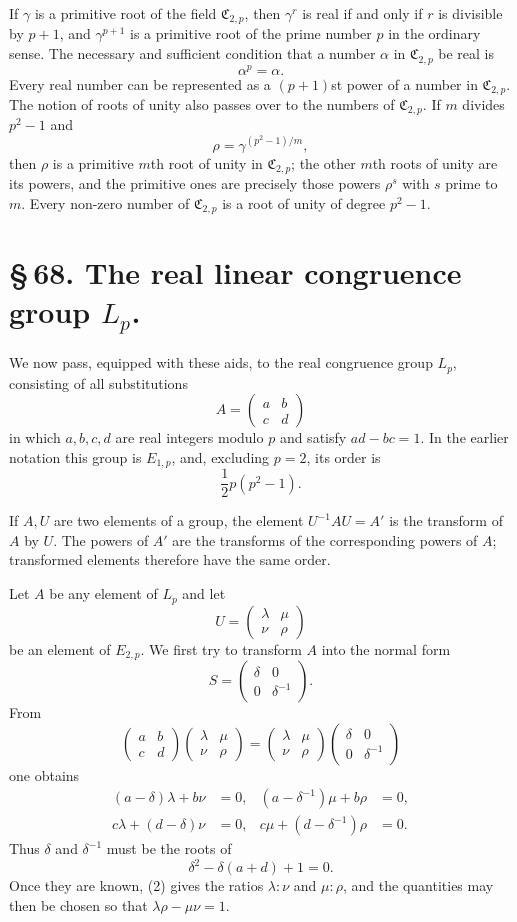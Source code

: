 \documentclass[11pt]{article}
\providecommand{\mat}[4]{\begin{pmatrix}#1&#2\\#3&#4\end{pmatrix}}
\providecommand{\mat}[4]{\begin{pmatrix}#1&#2\\#3&#4\end{pmatrix}}
\providecommand{\Cfield}{\mathfrak C}
\begin{document}
If $\gamma$ is a primitive root of the field $\Cfield_{2,p}$, then $\gamma^r$ is real if and only if $r$ is divisible by $p+1$, and $\gamma^{p+1}$ is a primitive root of the prime number $p$ in the ordinary sense. The necessary and sufficient condition that a number $\alpha$ in $\Cfield_{2,p}$ be real is
\[
 \alpha^p=\alpha .
\]
Every real number can be represented as a $(p+1)$st power of a number in $\Cfield_{2,p}$. The notion of roots of unity also passes over to the numbers of $\Cfield_{2,p}$. If $m$ divides $p^2-1$ and
\[
 \rho=\gamma^{(p^2-1)/m},
\]
then $\rho$ is a primitive $m$th root of unity in $\Cfield_{2,p}$; the other $m$th roots of unity are its powers, and the primitive ones are precisely those powers $\rho^s$ with $s$ prime to $m$. Every non-zero number of $\Cfield_{2,p}$ is a root of unity of degree $p^2-1$.

\section*{\S\,68. The real linear congruence group $L_p$.}

We now pass, equipped with these aids, to the real congruence group $L_p$, consisting of all substitutions
\[
 A=\mat{a}{b}{c}{d}
\]
in which $a,b,c,d$ are real integers modulo $p$ and satisfy $ad-bc=1$. In the earlier notation this group is $E_{1,p}$, and, excluding $p=2$, its order is
\[
 \frac12 p(p^2-1).
\]

If $A,U$ are two elements of a group, the element $U^{-1}AU=A'$ is the transform of $A$ by $U$. The powers of $A'$ are the transforms of the corresponding powers of $A$; transformed elements therefore have the same order.

Let $A$ be any element of $L_p$ and let
\[
 U=\mat{\lambda}{\mu}{\nu}{\rho}
\]
be an element of $E_{2,p}$. We first try to transform $A$ into the normal form
\begin{equation}
 S=\mat{\delta}{0}{0}{\delta^{-1}} .
 \tag{1}
\end{equation}
From
\[
 \mat{a}{b}{c}{d}\mat{\lambda}{\mu}{\nu}{\rho}
 =\mat{\lambda}{\mu}{\nu}{\rho}\mat{\delta}{0}{0}{\delta^{-1}}
\]
one obtains
\begin{equation}
\begin{aligned}
 (a-\delta)\lambda+b\nu&=0,&
 (a-\delta^{-1})\mu+b\rho&=0,\\
 c\lambda+(d-\delta)\nu&=0,&
 c\mu+(d-\delta^{-1})\rho&=0.
\end{aligned}
\tag{2}
\end{equation}
Thus $\delta$ and $\delta^{-1}$ must be the roots of
\begin{equation}
 \delta^2-\delta(a+d)+1=0.
 \tag{3}
\end{equation}
Once they are known, (2) gives the ratios $\lambda:\nu$ and $\mu:\rho$, and the quantities may then be chosen so that $\lambda\rho-\mu\nu=1$.
\end{document}
